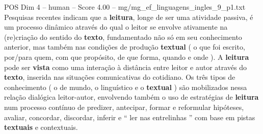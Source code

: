 \begin{textsample}{POS Dim 4 – human – Score 4.00 – mg/mg\_ef\_linguagens\_ingles\_9\_p1.txt}  \label{ex:f4_pos_017}
Pesquisas recentes indicam que a \textbf{leitura}, longe de ser uma atividade passiva, é um processo dinâmico através do qual o leitor se envolve ativamente na (re)criação do sentido do \textbf{texto}, fundamentado não só em seu conhecimento anterior, mas também nas condições de produção \textbf{textual} ( o que foi escrito, por/para quem, com que propósito, de que forma, quando e onde ).
A \textbf{leitura} pode ser \textbf{vista} como uma interação à distância entre leitor e autor através do \textbf{texto}, inserida nas situações comunicativas do cotidiano.
Os três tipos de conhecimento ( o de mundo, o linguístico e o \textbf{textual} ) são mobilizados nessa relação dialógica leitor-autor, envolvendo também o uso de estratégias de \textbf{leitura} num processo contínuo de predizer, antecipar, formar e reformular hipóteses, avaliar, concordar, discordar, inferir e “ ler nas entrelinhas ” com base em pistas \textbf{textuais} e contextuais.

\end{textsample}
